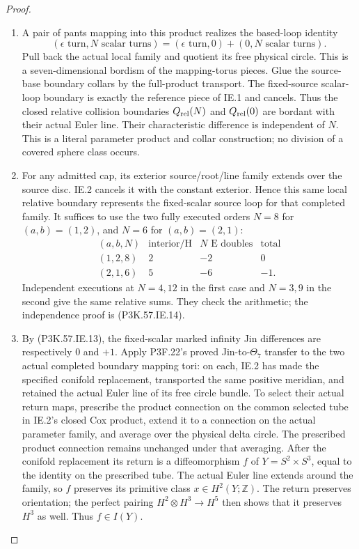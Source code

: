 \begin{proof}
\begin{enumerate}[label=\arabic*.]
\item A pair of pants mapping into this
product realizes the based-loop identity
\[
 (\epsilon\text{ turn},N\text{ scalar turns})
   =(\epsilon\text{ turn},0)+(0,N\text{ scalar turns}).    \tag{P3K.57.IE.14}
\]
Pull back the actual local family and
quotient its free physical circle.
This is a seven-dimensional bordism
of the mapping-torus pieces. Glue the
source-base boundary collars by the
full-product transport. The fixed-source
scalar-loop boundary is exactly the
reference piece of IE.1 and cancels.
Thus the closed relative collision
boundaries \(Q_{\rm rel}(N)\) and
\(Q_{\rm rel}(0)\) are bordant with
their actual Euler line. Their
characteristic difference is independent
of \(N\). This is a literal parameter
product and collar construction; no
division of a covered sphere class occurs.

\item For any admitted cap, its exterior
source/root/line family extends over
the source disc. IE.2 cancels it with
the constant exterior. Hence this
same local relative boundary represents
the fixed-scalar source loop for that
completed family. It suffices to use
the two fully executed orders \(N=8\)
for \((a,b)=(1,2)\), and \(N=6\) for
\((a,b)=(2,1)\):
\[
 \begin{array}{c|rrr}
 (a,b,N)&\text{interior/H}&N\text{ E doubles}&\text{total}\\ \hline
 (1,2,8)&2&-2&0\\
 (2,1,6)&5&-6&-1 .
 \end{array}                                           \tag{P3K.57.IE.15}
\]
Independent executions at \(N=4,12\)
in the first case and \(N=3,9\) in
the second give the same relative
sums. They check the arithmetic;
the independence proof is (P3K.57.IE.14).

\item By (P3K.57.IE.13), the fixed-scalar marked infinity
Jin differences are respectively \(0\) and \(+1\).
Apply P3F.22's proved Jin-to-\(\Theta_7\) transfer
to the two actual completed boundary mapping
tori: on each, IE.2 has made the specified conifold
replacement, transported the same positive meridian,
and retained the actual Euler line of its free circle
bundle. To select their actual return maps, prescribe
the product connection on the common selected tube
in IE.2's closed Cox product, extend it to a connection
on the actual parameter family, and average over
the physical delta circle. The prescribed product
connection remains unchanged under that averaging.
After the conifold replacement its return is a
diffeomorphism \(f\) of \(Y=S^2\times S^3\), equal
to the identity on the prescribed tube. The actual
Euler line extends around the family, so \(f\)
preserves its primitive class \(x\in H^2(Y;\mathbb Z)\).
The return preserves orientation; the perfect
pairing \(H^2\otimes H^3\to H^5\) then shows that
it preserves \(H^3\) as well. Thus \(f\in I(Y)\).


\end{enumerate}
\end{proof}
